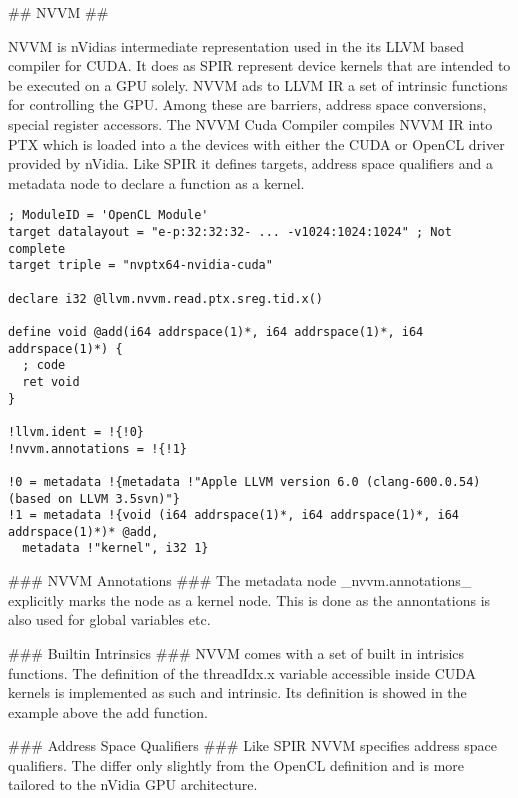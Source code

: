 \begin{markdown}
## NVVM ##

NVVM is nVidias intermediate representation used in the its LLVM based
compiler for CUDA. It does as SPIR represent device kernels that are
intended to be executed on a GPU solely. NVVM ads to LLVM IR a set of
intrinsic functions for controlling the GPU. Among these are barriers,
address space conversions, special register accessors. The NVVM Cuda
Compiler compiles NVVM IR into PTX which is loaded into a the devices
with either the CUDA or OpenCL driver provided by nVidia. Like SPIR it
defines targets, address space qualifiers and a metadata node to
declare a function as a kernel.

\begin{verbatim}
; ModuleID = 'OpenCL Module'
target datalayout = "e-p:32:32:32- ... -v1024:1024:1024" ; Not complete
target triple = "nvptx64-nvidia-cuda"

declare i32 @llvm.nvvm.read.ptx.sreg.tid.x()

define void @add(i64 addrspace(1)*, i64 addrspace(1)*, i64 addrspace(1)*) {
  ; code
  ret void
}

!llvm.ident = !{!0}
!nvvm.annotations = !{!1}

!0 = metadata !{metadata !"Apple LLVM version 6.0 (clang-600.0.54) (based on LLVM 3.5svn)"}
!1 = metadata !{void (i64 addrspace(1)*, i64 addrspace(1)*, i64 addrspace(1)*)* @add,
  metadata !"kernel", i32 1}
\end{verbatim}

### NVVM Annotations ###
The metadata node _nvvm.annotations_ explicitly marks the node as a
kernel node. This is done as the annontations is also used for global
variables etc. 

### Builtin Intrinsics ###
NVVM comes with a set of built in intrisics functions. The definition
of the threadIdx.x variable accessible inside CUDA kernels is
implemented as such and intrinsic. Its definition is showed in the
example above the add function. 

### Address Space Qualifiers ###
Like SPIR NVVM specifies address space qualifiers. The differ only
slightly from the OpenCL definition and is more tailored to the nVidia
GPU architecture.




\end{markdown}

